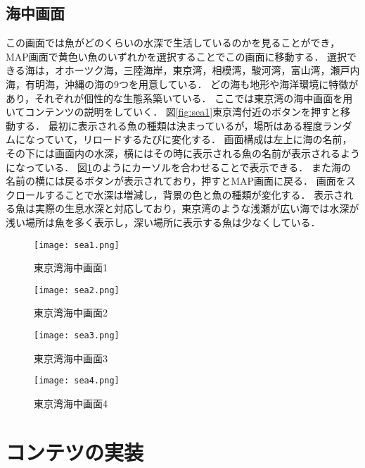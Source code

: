 \documentclass[12pt,a4j,titlepage]{ltjsarticle}
\begin{document}
\subsection{海中画面}
この画面では魚がどのくらいの水深で生活しているのかを見ることができ，MAP画面で黄色い魚のいずれかを選択することでこの画面に移動する．
選択できる海は，オホーツク海，三陸海岸，東京湾，相模湾，駿河湾，富山湾，瀬戸内海，有明海，沖縄の海の9つを用意している．
どの海も地形や海洋環境に特徴があり，それぞれが個性的な生態系築いている．
ここでは東京湾の海中画面を用いてコンテンツの説明をしていく．
図\ref{fig:sea1}東京湾付近のボタンを押すと移動する．
最初に表示される魚の種類は決まっているが，場所はある程度ランダムになっていて，リロードするたびに変化する．
画面構成は左上に海の名前，その下には画面内の水深，横にはその時に表示される魚の名前が表示されるようになっている．
図\ref{fig:sea2}のようにカーソルを合わせることで表示できる．
また海の名前の横には戻るボタンが表示されており，押すとMAP画面に戻る．
画面をスクロールすることで水深は増減し，背景の色と魚の種類が変化する．
表示される魚は実際の生息水深と対応しており，東京湾のような浅瀬が広い海では水深が浅い場所は魚を多く表示し，深い場所に表示する魚は少なくしている．

\begin{figure}[h]
\centering
\begin{minipage}[b]{0.49\columnwidth}
\centering
\texttt{[image: sea1.png]}
 \caption{東京湾海中画面1}
 \label{fig:sea1}
\end{minipage}
\begin{minipage}[b]{0.49\columnwidth}
\centering
\texttt{[image: sea2.png]}
 \caption{東京湾海中画面2}
 \label{fig:sea2}
 \end{minipage}
\end{figure}

\begin{figure}[h]
\centering
\begin{minipage}[b]{0.49\columnwidth}
\centering
\texttt{[image: sea3.png]}
 \caption{東京湾海中画面3}
 \label{fig:sea3}
\end{minipage}
\begin{minipage}[b]{0.49\columnwidth}
\centering
\texttt{[image: sea4.png]}
 \caption{東京湾海中画面4}
 \label{fig:sea4}
 \end{minipage}
\end{figure}

\section{コンテツの実装}\label{コンテンツの実装}
\end{document}
